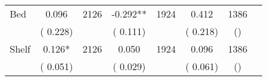 \begin{tabular}{l*{6}{c}}
Bed        &              0.096      &       2126       &             -0.292**      &       1924       &              0.412      &       1386  &  &              \\
                       &       (       0.228)            &                               &       (       0.111)            &                               &       (       0.218)            &       () &                  \\
Shelf        &              0.126*      &       2126       &              0.050      &       1924       &              0.096      &       1386  &  &              \\
                       &       (       0.051)            &                               &       (       0.029)            &                               &       (       0.061)            &       () &                  \\
\hline \end{tabular}
